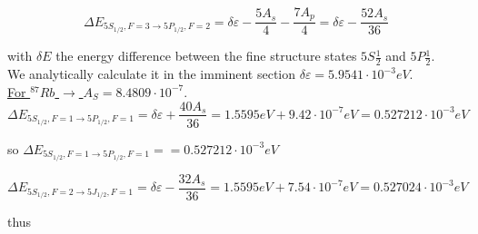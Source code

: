 \documentclass[openany,11pt,a4paper]{book}
\begin{document}


\begin{equation*}
\Delta E_{5S_{1/2}, F=3 \rightarrow 5P_{1/2}, F=2} = \delta\varepsilon -\dfrac{5 A_{s}}{4} - \dfrac{7 A_{p}}{4}=\delta\varepsilon -\dfrac{52 A_{s}}{36}
\end{equation*}

with $\delta E$ the energy difference between the fine structure states $5S\frac{1}{2}$ and $5P\frac{1}{2}$.\\

We analytically calculate it in the imminent section $\delta\varepsilon = 5.9541 \cdot 10^{-3} eV$.\\


 \underline{ For $^{87}Rb$ $\rightarrow$ $A_{S}= 8.4809 \cdot 10^{-7}$}.\\ 




\begin{equation*}
\Delta E_{5S_{1/2},F=1 \rightarrow 5P_{1/2}, F=1} = \delta\varepsilon +  \dfrac{40 A_{s}}{36} = 1.5595 eV + 9.42\cdot 10^{-7} eV = 0.527212 \cdot 10^{-3} eV
\end{equation*}

so $\Delta E_{5S_{1/2},F=1 \rightarrow 5P_{1/2}, F=1}=  = 0.527212 \cdot 10^{-3} eV$


\begin{equation*}
\Delta E_{ 5S_{1/2}, F=2 \rightarrow 5J_{1/2}, F=1} = \delta\varepsilon -\dfrac{32 A_{s}}{36} = 1.5595 eV + 7.54 \cdot 10^{-7} eV= 0.527024 \cdot 10^{-3} eV
\end{equation*}

thus
\end{document}
